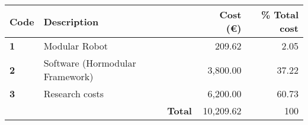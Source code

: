 \begin{center}
    \begin{tabular}{ | l || p{9cm}  l | r | r |}
    \hline
    \textbf{Code} & \multicolumn{1}{l}{\textbf{Description}} &  & \textbf{Cost (\euro)}  & \textbf{\% Total cost} \\ \hline \hline
    
    \textbf{1} & Modular Robot &  & 209.62 & 2.05\\ \hline
    
	\textbf{2} & Software (Hormodular Framework) &  & 3,800.00 & 37.22 \\ \hline

	\textbf{3}& Research costs &  & 6,200.00 & 60.73\\ \hline 
	
	\multicolumn{1}{r}{} & & \textbf{Total} & 10,209.62 & 100\\  \cline{4-5}
    	
	
\end{tabular}
\end{center}